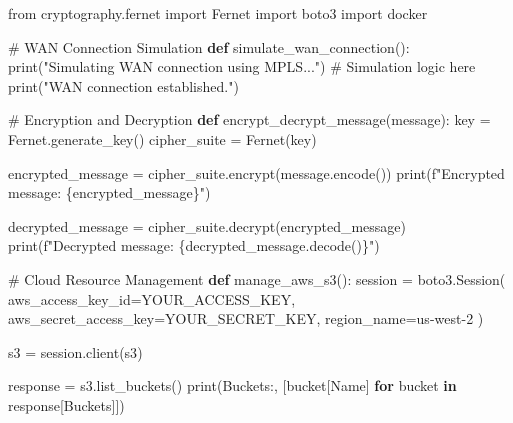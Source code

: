 \documentclass[
  letterpaper,
  DIV=11,
  numbers=noendperiod]{scrreprt}
\newenvironment{Shaded}{\begin{snugshade}}{\end{snugshade}}
\newcommand{\BuiltInTok}[1]{\textcolor[rgb]{0.00,0.23,0.31}{#1}}
\newcommand{\CommentTok}[1]{\textcolor[rgb]{0.37,0.37,0.37}{#1}}
\newcommand{\ControlFlowTok}[1]{\textcolor[rgb]{0.00,0.23,0.31}{\textbf{#1}}}
\newcommand{\ImportTok}[1]{\textcolor[rgb]{0.00,0.46,0.62}{#1}}
\newcommand{\KeywordTok}[1]{\textcolor[rgb]{0.00,0.23,0.31}{\textbf{#1}}}
\newcommand{\NormalTok}[1]{\textcolor[rgb]{0.00,0.23,0.31}{#1}}
\newcommand{\OperatorTok}[1]{\textcolor[rgb]{0.37,0.37,0.37}{#1}}
\newcommand{\SpecialCharTok}[1]{\textcolor[rgb]{0.37,0.37,0.37}{#1}}
\newcommand{\SpecialStringTok}[1]{\textcolor[rgb]{0.13,0.47,0.30}{#1}}
\newcommand{\StringTok}[1]{\textcolor[rgb]{0.13,0.47,0.30}{#1}}
\begin{document}
\begin{Shaded}
\begin{Highlighting}[]
\ImportTok{from}\NormalTok{ cryptography.fernet }\ImportTok{import}\NormalTok{ Fernet}
\ImportTok{import}\NormalTok{ boto3}
\ImportTok{import}\NormalTok{ docker}

\CommentTok{\# WAN Connection Simulation}
\KeywordTok{def}\NormalTok{ simulate\_wan\_connection():}
    \BuiltInTok{print}\NormalTok{(}\StringTok{"Simulating WAN connection using MPLS..."}\NormalTok{)}
    \CommentTok{\# Simulation logic here}
    \BuiltInTok{print}\NormalTok{(}\StringTok{"WAN connection established."}\NormalTok{)}

\CommentTok{\# Encryption and Decryption}
\KeywordTok{def}\NormalTok{ encrypt\_decrypt\_message(message):}
\NormalTok{    key }\OperatorTok{=}\NormalTok{ Fernet.generate\_key()}
\NormalTok{    cipher\_suite }\OperatorTok{=}\NormalTok{ Fernet(key)}
    
\NormalTok{    encrypted\_message }\OperatorTok{=}\NormalTok{ cipher\_suite.encrypt(message.encode())}
    \BuiltInTok{print}\NormalTok{(}\SpecialStringTok{f"Encrypted message: }\SpecialCharTok{\{}\NormalTok{encrypted\_message}\SpecialCharTok{\}}\SpecialStringTok{"}\NormalTok{)}
    
\NormalTok{    decrypted\_message }\OperatorTok{=}\NormalTok{ cipher\_suite.decrypt(encrypted\_message)}
    \BuiltInTok{print}\NormalTok{(}\SpecialStringTok{f"Decrypted message: }\SpecialCharTok{\{}\NormalTok{decrypted\_message}\SpecialCharTok{.}\NormalTok{decode()}\SpecialCharTok{\}}\SpecialStringTok{"}\NormalTok{)}

\CommentTok{\# Cloud Resource Management}
\KeywordTok{def}\NormalTok{ manage\_aws\_s3():}
\NormalTok{    session }\OperatorTok{=}\NormalTok{ boto3.Session(}
\NormalTok{        aws\_access\_key\_id}\OperatorTok{=}\StringTok{\textquotesingle{}YOUR\_ACCESS\_KEY\textquotesingle{}}\NormalTok{,}
\NormalTok{        aws\_secret\_access\_key}\OperatorTok{=}\StringTok{\textquotesingle{}YOUR\_SECRET\_KEY\textquotesingle{}}\NormalTok{,}
\NormalTok{        region\_name}\OperatorTok{=}\StringTok{\textquotesingle{}us{-}west{-}2\textquotesingle{}}
\NormalTok{    )}
    
\NormalTok{    s3 }\OperatorTok{=}\NormalTok{ session.client(}\StringTok{\textquotesingle{}s3\textquotesingle{}}\NormalTok{)}
    
\NormalTok{    response }\OperatorTok{=}\NormalTok{ s3.list\_buckets()}
    \BuiltInTok{print}\NormalTok{(}\StringTok{\textquotesingle{}Buckets:\textquotesingle{}}\NormalTok{, [bucket[}\StringTok{\textquotesingle{}Name\textquotesingle{}}\NormalTok{] }\ControlFlowTok{for}\NormalTok{ bucket }\KeywordTok{in}\NormalTok{ response[}\StringTok{\textquotesingle{}Buckets\textquotesingle{}}\NormalTok{]])}


\end{Highlighting}
\end{Shaded}
\end{document}
